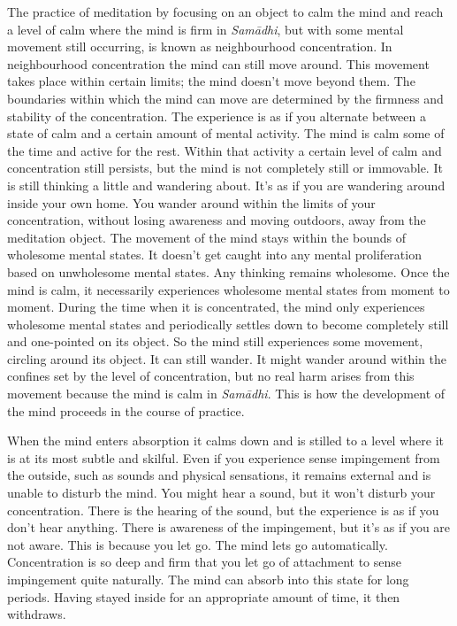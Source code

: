 The practice of meditation by focusing on an object to calm the mind and reach a level of calm where the mind is firm in \textit{Sam\=adhi}, but with some mental movement still occurring, is known as neighbourhood concentration. In neighbourhood concentration the mind can still move around. This movement takes place within certain limits; the mind doesn't move beyond them. The boundaries within which the mind can move are determined by the firmness and stability of the concentration. The experience is as if you alternate between a state of calm and a certain amount of mental activity. The mind is calm some of the time and active for the rest. Within that activity a certain level of calm and concentration still persists, but the mind is not completely still or immovable. It is still thinking a little and wandering about. It's as if you are wandering around inside your own home. You wander around within the limits of your concentration, without losing awareness and moving outdoors, away from the meditation object. The movement of the mind stays within the bounds of wholesome mental states. It doesn't get caught into any mental proliferation based on unwholesome mental states. Any thinking remains wholesome. Once the mind is calm, it necessarily experiences wholesome mental states from moment to moment. During the time when it is concentrated, the mind only experiences wholesome mental states and periodically settles down to become completely still and one-pointed on its object. So the mind still experiences some movement, circling around its object. It can still wander. It might wander around within the confines set by the level of concentration, but no real harm arises from this movement because the mind is calm in \textit{Sam\=adhi}. This is how the development of the mind proceeds in the course of practice.

When the mind enters absorption it calms down and is stilled to a level where it is at its most subtle and skilful. Even if you experience sense impingement from the outside, such as sounds and physical sensations, it remains external and is unable to disturb the mind. You might hear a sound, but it won't disturb your concentration. There is the hearing of the sound, but the experience is as if you don't hear anything. There is awareness of the impingement, but it's as if you are not aware. This is because you let go. The mind lets go automatically. Concentration is so deep and firm that you let go of attachment to sense impingement quite naturally. The mind can absorb into this state for long periods. Having stayed inside for an appropriate amount of time, it then withdraws.

